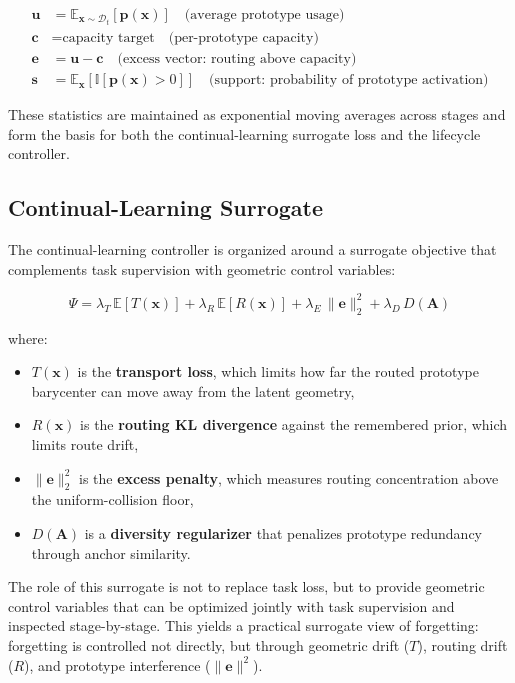\documentclass[11pt,a4paper]{article}
\theoremstyle{definition}
\begin{document}
\begin{align}
\mathbf{u} &= \mathbb{E}_{\mathbf{x} \sim \mathcal{D}_t}[\mathbf{p}(\mathbf{x})] \quad \text{(average prototype usage)} \\
\mathbf{c} &= \text{capacity target} \quad \text{(per-prototype capacity)} \\
\mathbf{e} &= \mathbf{u} - \mathbf{c} \quad \text{(excess vector: routing above capacity)} \\
\mathbf{s} &= \mathbb{E}_{\mathbf{x}}[\mathbb{I}[\mathbf{p}(\mathbf{x}) > 0]] \quad \text{(support: probability of prototype activation)}
\end{align}

These statistics are maintained as exponential moving averages across stages and form the basis for both the continual-learning surrogate loss and the lifecycle controller.

\subsection{Continual-Learning Surrogate}

The continual-learning controller is organized around a surrogate objective that complements task supervision with geometric control variables:

\begin{equation}
\Psi = \lambda_T \, \mathbb{E}[T(\mathbf{x})] + \lambda_R \, \mathbb{E}[R(\mathbf{x})] + \lambda_E \, \|\mathbf{e}\|_2^2 + \lambda_D \, D(\mathbf{A})
\end{equation}

where:
\begin{itemize}
    \item $T(\mathbf{x})$ is the \textbf{transport loss}, which limits how far the routed prototype barycenter can move away from the latent geometry,
    \item $R(\mathbf{x})$ is the \textbf{routing KL divergence} against the remembered prior, which limits route drift,
    \item $\|\mathbf{e}\|_2^2$ is the \textbf{excess penalty}, which measures routing concentration above the uniform-collision floor,
    \item $D(\mathbf{A})$ is a \textbf{diversity regularizer} that penalizes prototype redundancy through anchor similarity.
\end{itemize}

The role of this surrogate is not to replace task loss, but to provide geometric control variables that can be optimized jointly with task supervision and inspected stage-by-stage. This yields a practical surrogate view of forgetting: forgetting is controlled not directly, but through geometric drift ($T$), routing drift ($R$), and prototype interference ($\|\mathbf{e}\|^2$).
\end{document}
